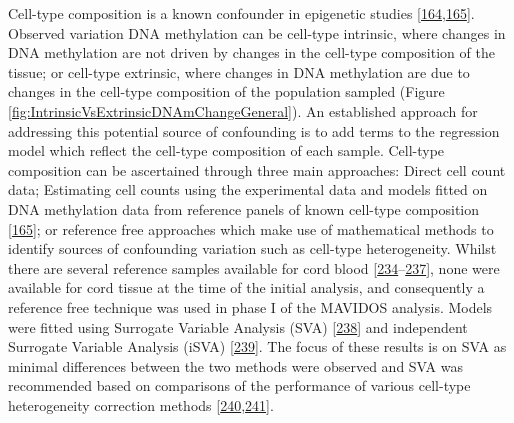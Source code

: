 \documentclass[
]{book}
\begin{document}
Cell-type composition is a known confounder in epigenetic studies {[}\protect\hyperlink{ref-Jaffe2014}{164},\protect\hyperlink{ref-Houseman2012}{165}{]}.
Observed variation DNA methylation can be cell-type intrinsic, where changes in DNA methylation are not driven by changes in the cell-type composition of the tissue; or cell-type extrinsic, where changes in DNA methylation are due to changes in the cell-type composition of the population sampled (Figure \ref{fig:IntrinsicVsExtrinsicDNAmChangeGeneral}).
An established approach for addressing this potential source of confounding is to add terms to the regression model which reflect the cell-type composition of each sample.
Cell-type composition can be ascertained through three main approaches: Direct cell count data; Estimating cell counts using the experimental data and models fitted on DNA methylation data from reference panels of known cell-type composition {[}\protect\hyperlink{ref-Houseman2012}{165}{]}; or reference free approaches which make use of mathematical methods to identify sources of confounding variation such as cell-type heterogeneity.
Whilst there are several reference samples available for cord blood {[}\protect\hyperlink{ref-Cardenas2016}{234}--\protect\hyperlink{ref-Gervin2016}{237}{]}, none were available for cord tissue at the time of the initial analysis, and consequently a reference free technique was used in phase I of the MAVIDOS analysis.
Models were fitted using Surrogate Variable Analysis (SVA) {[}\protect\hyperlink{ref-Leek2007}{238}{]} and independent Surrogate Variable Analysis (iSVA) {[}\protect\hyperlink{ref-Teschendorff2011}{239}{]}.
The focus of these results is on SVA as minimal differences between the two methods were observed and SVA was recommended based on comparisons of the performance of various cell-type heterogeneity correction methods {[}\protect\hyperlink{ref-McGregor2016}{240},\protect\hyperlink{ref-Teschendorff2017}{241}{]}.
\end{document}
